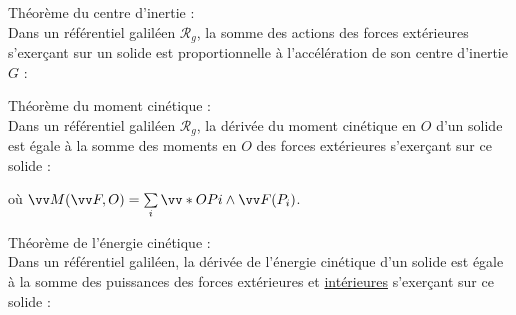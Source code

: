 \documentclass[a4paper]{article}
\begin{document}
\pagestyle{fancy}
\fancyhf{}
\setlength{\headheight}{15pt}

\begin{center}
	\large{}
\end{center}


Théorème du centre d'inertie :\\
Dans un référentiel galiléen \(\mathcal{R}_g\), la somme des actions des forces extérieures s'exerçant sur un solide est proportionnelle à l'accélération de son centre d'inertie \(G\) :
\begin{center}
\end{center}

Théorème du moment cinétique :\\
Dans un référentiel galiléen \(\mathcal{R}_g\), la dérivée du moment cinétique en \(O\) d'un solide est égale à la somme des moments en \(O\) des forces extérieures s'exerçant sur ce solide :
\begin{center}
\end{center}
où \( \vv M(\vv F,O) = \sum\limits_i \vv*{OP}i\wedge\vv F(P_i) \).

Théorème de l'énergie cinétique :\\
Dans un référentiel galiléen, la dérivée de l'énergie cinétique d'un solide est égale à la somme des puissances des forces extérieures et \underline{intérieures} s'exerçant sur ce solide :
\begin{center}
\end{center}
\end{document}
